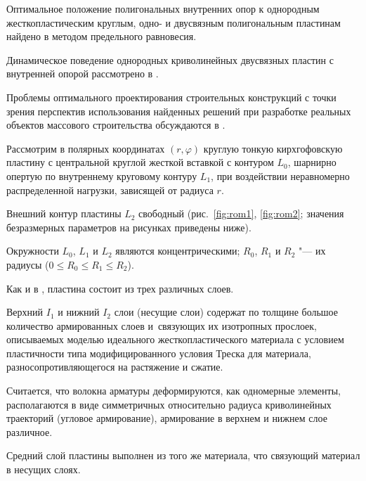 Оптимальное положение полигональных внутренних опор к однородным жесткопластическим круглым, одно- и двусвязным полигональным пластинам найдено в \cite{rom:bib12, rom:bib13} методом предельного равновесия.

Динамическое поведение однородных криволинейных двусвязных пластин с внутренней опорой рассмотрено в \cite{rom:bib14}.

Проблемы оптимального проектирования строительных конструкций с точки зрения перспектив использования найденных решений при разработке реальных объектов массового строительства обсуждаются в \cite{rom:bib15}.



\smallskip









 Рассмотрим в полярных координатах $(r,\varphi)$ круглую тонкую кирхгофовскую пластину с центральной круглой жесткой вставкой с контуром $L_0$, шарнирно опертую по внутреннему круговому контуру $L_1$, при воздействии неравномерно распределенной нагрузки, зависящей от радиуса $r$.

Внешний контур пластины $L_2$ свободный (рис.~\ref{fig:rom1},  \ref{fig:rom2}; значения безразмерных параметров на рисунках приведены ниже).

Окружности $L_0$, $L_1$ и $L_2$ являются концентрическими; $R_0$, $R_1$ и $R_2$ "--- их  радиусы ($0\le R_0\le R_1\le R_2$).

Как и в \cite{rom:bib3}, пластина состоит из трех различных слоев.

Верхний $I_1$ и нижний $I_2$ слои (несущие слои) содержат по толщине большое количество армированных слоев и~связующих их изотропных прослоек, описываемых моделью идеального жесткопластического материала с условием пластичности типа модифицированного условия Треска для материала, разносопротивляющегося на растяжение и сжатие.

Считается, что волокна арматуры деформируются, как одномерные элементы, располагаются в виде симметричных относительно радиуса криволинейных траекторий (угловое армирование), армирование в верхнем и нижнем слое различное.

Средний слой пластины выполнен из того же материала, что связующий материал в несущих слоях.



